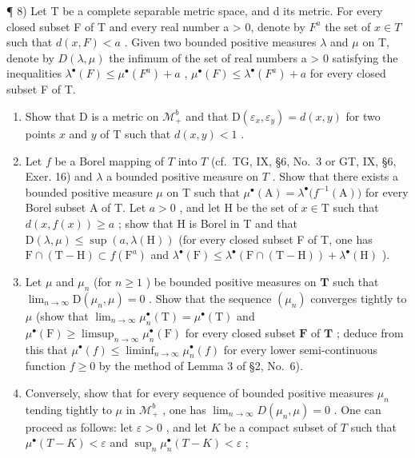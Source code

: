 ¶ 8) Let T be a complete separable metric space, and d its metric. For every closed subset F of T and every real number a > 0, denote by \(F^{a}\) the set of \(x \in T\) such that \(d(x, F) < a\) . Given two bounded positive measures \(\lambda\) and \(\mu\) on T, denote by \(D(\lambda, \mu)\) the infimum of the set of real numbers a > 0 satisfying the inequalities \(\lambda^{\bullet}(F) \leqslant \mu^{\bullet}(F^{a}) + a\) , \(\mu^{\bullet}(F) \leqslant \lambda^{\bullet}(F^{a}) + a\) for every closed subset F of T.

\begin{enumerate}
\def\labelenumi{\alph{enumi})}
\item
  Show that D is a metric on \(\mathcal{M}_+^b\) and that \(\mathrm{D}(\varepsilon_x,\varepsilon_y) = d(x,y)\) for two points \(x\) and \(y\) of T such that \(d(x,y) < 1\) .
\item
  Let \(f\) be a Borel mapping of \(T\) into \(T\) (cf.~TG, IX, §6, No.~3 or GT, IX, §6, Exer. 16) and \(\lambda\) a bounded positive measure on \(T\) . Show that there exists a bounded positive measure \(\mu\) on T such that \(\mu^{\bullet}(\mathrm{A}) = \lambda^{\bullet}\big(f^{-1}(\mathrm{A})\big)\) for every Borel subset A of T. Let \(a > 0\) , and let H be the set of \(x \in \mathrm{T}\) such that \(d(x, f(x)) \geqslant a\) ; show that H is Borel in T and that \(\mathrm{D}(\lambda, \mu) \leqslant \sup (a, \lambda(\mathrm{H}))\) (for every closed subset F of T, one has \(\mathrm{F} \cap (\mathrm{T} - \mathrm{H}) \subset f(\mathrm{F}^a)\) and \(\lambda^{\bullet}(\mathrm{F}) \leqslant \lambda^{\bullet}(\mathrm{F} \cap (\mathrm{T} - \mathrm{H})) + \lambda^{\bullet}(\mathrm{H})\) ).
\item
  Let \(\mu\) and \(\mu_n\) (for \(n \geqslant 1\) ) be bounded positive measures on \(\mathbf{T}\) such that \(\lim_{n \to \infty} \mathrm{D}(\mu_n, \mu) = 0\) . Show that the sequence \((\mu_n)\) converges tightly to \(\mu\) (show that \(\lim_{n \to \infty} \mu_n^\bullet(\mathrm{T}) = \mu^\bullet(\mathrm{T})\) and \(\mu^\bullet(\mathrm{F}) \geqslant \limsup_{n \to \infty} \mu_n^\bullet(\mathrm{F})\) for every closed subset \(\mathbf{F}\) of \(\mathbf{T}\) ; deduce from this that \(\mu^\bullet(f) \leqslant \liminf_{n \to \infty} \mu_n^\bullet(f)\) for every lower semi-continuous function \(f \geqslant 0\) by the method of Lemma 3 of §2, No.~6).
\item
  Conversely, show that for every sequence of bounded positive measures \(\mu_n\) tending tightly to \(\mu\) in \(\mathcal{M}_+^b\) , one has \(\lim_{n \to \infty} D(\mu_n, \mu) = 0\) . One can proceed as follows: let \(\varepsilon > 0\) , and let \(K\) be a compact subset of \(T\) such that \(\mu^\bullet(T - K) < \varepsilon\) and \(\sup_{n} \mu_n^\bullet(T - K) < \varepsilon\) ;
\end{enumerate}

